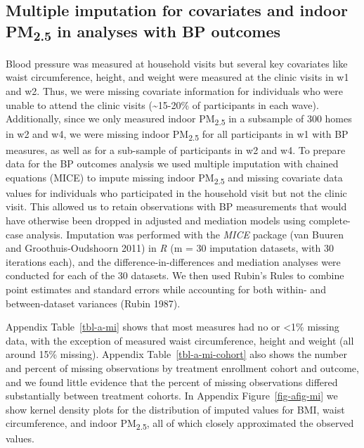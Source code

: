 \documentclass[
  letterpaper,
  DIV=11,
  numbers=noendperiod]{scrartcl}
\begin{document}
\subsection{\texorpdfstring{Multiple imputation for covariates and
indoor PM\textsubscript{2.5} in analyses with BP
outcomes}{Multiple imputation for covariates and indoor PM2.5 in analyses with BP outcomes}}\label{multiple-imputation-for-covariates-and-indoor-pm2.5-in-analyses-with-bp-outcomes}

Blood pressure was measured at household visits but several key
covariates like waist circumference, height, and weight were measured at
the clinic visits in w1 and w2. Thus, we were missing covariate
information for individuals who were unable to attend the clinic visits
(\textasciitilde15-20\% of participants in each wave). Additionally,
since we only measured indoor PM\textsubscript{2.5} in a subsample of
300 homes in w2 and w4, we were missing indoor PM\textsubscript{2.5} for
all participants in w1 with BP measures, as well as for a sub-sample of
participants in w2 and w4. To prepare data for the BP outcomes analysis
we used multiple imputation with chained equations (MICE) to impute
missing indoor PM\textsubscript{2.5} and missing covariate data values
for individuals who participated in the household visit but not the
clinic visit. This allowed us to retain observations with BP
measurements that would have otherwise been dropped in adjusted and
mediation models using complete-case analysis. Imputation was performed
with the \emph{MICE} package (van Buuren and Groothuis-Oudshoorn 2011)
in \emph{R} (m = 30 imputation datasets, with 30 iterations each), and
the difference-in-differences and mediation analyses were conducted for
each of the 30 datasets. We then used Rubin's Rules to combine point
estimates and standard errors while accounting for both within- and
between-dataset variances (Rubin 1987).

Appendix  Table~\ref{tbl-a-mi} shows that most
measures had no or \textless1\% missing data, with the exception of
measured waist circumference, height and weight (all around 15\%
missing). Appendix Table~\ref{tbl-a-mi-cohort} also shows the number and
percent of missing observations by treatment enrollment cohort and
outcome, and we found little evidence that the percent of missing
observations differed substantially between treatment cohorts. In
Appendix Figure~\ref{fig-afig-mi} we show kernel density plots for the
distribution of imputed values for BMI, waist circumference, and indoor
PM\textsubscript{2.5}, all of which closely approximated the observed
values.
\end{document}
